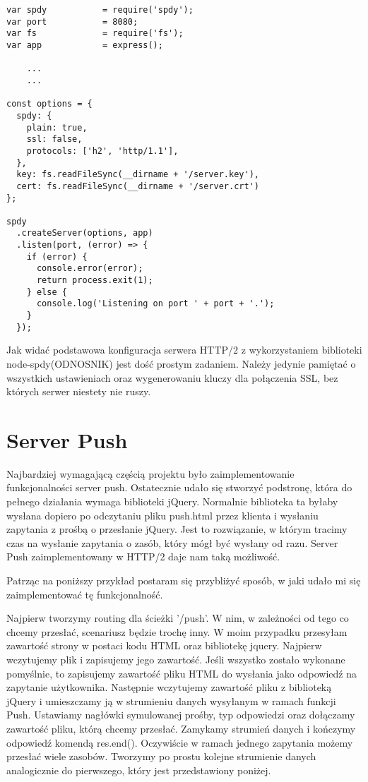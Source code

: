 \documentclass[a4paper,12pt,twoside,openany]{report}
\begin{document}
\begin{lstlisting}
var spdy           = require('spdy');
var port           = 8080;
var fs             = require('fs');
var app            = express();

	...
	...
	
const options = {
  spdy: {
    plain: true,
    ssl: false,
    protocols: ['h2', 'http/1.1'],
  },
  key: fs.readFileSync(__dirname + '/server.key'),
  cert: fs.readFileSync(__dirname + '/server.crt')
};

spdy
  .createServer(options, app)
  .listen(port, (error) => {
    if (error) {
      console.error(error);
      return process.exit(1);
    } else {
      console.log('Listening on port ' + port + '.');
    }
  });
\end{lstlisting}

Jak widać podstawowa konfiguracja serwera HTTP/2 z wykorzystaniem biblioteki node-spdy(ODNOSNIK) jest dość prostym zadaniem.
Należy jedynie pamiętać o wszystkich ustawieniach oraz wygenerowaniu kluczy dla połączenia SSL, bez których serwer niestety nie ruszy.

\section{Server Push}

Najbardziej wymagającą częścią projektu było zaimplementowanie funkcjonalności server push.
Ostatecznie udało się stworzyć podstronę, która do pełnego działania wymaga biblioteki jQuery.
Normalnie biblioteka ta byłaby wysłana dopiero po odczytaniu pliku push.html przez klienta i wysłaniu zapytania z prośbą o przesłanie jQuery.
Jest to rozwiązanie, w którym tracimy czas na wysłanie zapytania o zasób, który mógł być wysłany od razu.
Server Push zaimplementowany w HTTP/2 daje nam taką możliwość.

Patrząc na poniższy przykład postaram się przybliżyć sposób, w jaki udało mi się zaimplementować tę funkcjonalność.

Najpierw tworzymy routing dla ścieżki '/push'.
W nim, w zależności od tego co chcemy przesłać, scenariusz będzie trochę inny.
W moim przypadku przesyłam zawartość strony w postaci kodu HTML oraz bibliotekę jquery.
Najpierw wczytujemy plik i zapisujemy jego zawartość.
Jeśli wszystko zostało wykonane pomyślnie, to zapisujemy zawartość pliku HTML do wysłania jako odpowiedź na zapytanie użytkownika.
Następnie wczytujemy zawartość pliku z biblioteką jQuery i umieszczamy ją w strumieniu danych wysyłanym w ramach funkcji Push.
Ustawiamy nagłówki symulowanej prośby, typ odpowiedzi oraz dołączamy zawartość pliku, którą chcemy przesłać.
Zamykamy strumień danych i kończymy odpowiedź komendą res.end().
Oczywiście w ramach jednego zapytania możemy przesłać wiele zasobów.
Tworzymy po prostu kolejne strumienie danych analogicznie do pierwszego, który jest przedstawiony poniżej.
\end{document}
